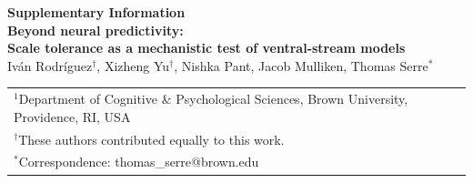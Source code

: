 \documentclass[pdflatex,sn-nature]{sn-jnl}
\begin{document}



\clearpage

\begin{center}
{\LARGE \textbf{Supplementary Information}}\\[0.75ex]
{\large \textbf{Beyond neural predictivity: \\ Scale tolerance as a mechanistic test of ventral-stream models}}\\[2em]
Iv\'an Rodr\'iguez$^{\dagger}$, Xizheng Yu$^{\dagger}$, Nishka Pant, Jacob Mulliken, Thomas Serre$^{*}$
\end{center}

\vspace{1em}

\setcounter{secnumdepth}{2}
\setcounter{tocdepth}{2}

{\small
\begin{tabular}{l}
$^{1}$Department of Cognitive \& Psychological Sciences, Brown University, Providence, RI, USA\\
$^{\dagger}$These authors contributed equally to this work.\\
$^{*}$Correspondence: thomas\_serre@brown.edu\\
\end{tabular}
}

\vspace{1cm}

\tableofcontents
\clearpage

\setcounter{section}{0}
\renewcommand{\thesection}{S\arabic{section}}
\setcounter{subsection}{0}
\renewcommand{\thesubsection}{S\arabic{section}.\arabic{subsection}}

\setcounter{figure}{0}
\renewcommand{\thefigure}{S\arabic{figure}}
\setcounter{table}{0}
\renewcommand{\thetable}{S\arabic{table}}
\setcounter{equation}{0}
\renewcommand{\theequation}{S\arabic{equation}}
\end{document}
